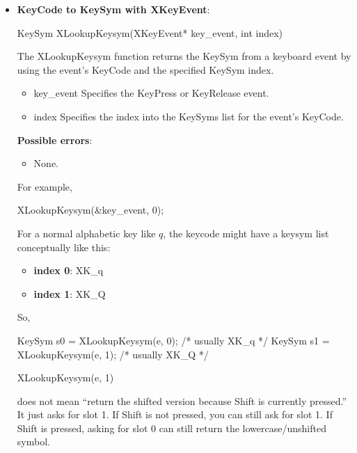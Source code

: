 \documentclass{report}
\begin{document}
\begin{itemize}
            \textbf{Possible errors}:
            \begin{itemize}
                \item None.
            \end{itemize}
        \item \textbf{KeyCode to KeySym with XKeyEvent}:
            \bigbreak \noindent 
            \begin{cppcode}
                KeySym XLookupKeysym(XKeyEvent* key_event, int index)
            \end{cppcode}
            \bigbreak \noindent
            The XLookupKeysym function returns the KeySym from a keyboard event by using the event's KeyCode and the specified KeySym index.
            \begin{itemize}
                \item key\_event Specifies the KeyPress or KeyRelease event.
                \item index Specifies the index into the KeySyms list for the event’s KeyCode.
            \end{itemize}
            \textbf{Possible errors}:
            \begin{itemize}
                \item None.
            \end{itemize}
            \bigbreak \noindent 
            For example,
            \bigbreak \noindent 
            \begin{cppcode}
                XLookupKeysym(&key_event, 0);
            \end{cppcode}
            \bigbreak \noindent 
            For a normal alphabetic key like $q$, the keycode might have a keysym list conceptually like this:
            \begin{itemize}
                \item \textbf{index 0}: XK\_q
                \item \textbf{index 1}: XK\_Q
            \end{itemize}
            So,
            \bigbreak \noindent 
            \begin{cppcode}
                KeySym s0 = XLookupKeysym(e, 0);  /* usually XK_q */
                KeySym s1 = XLookupKeysym(e, 1);  /* usually XK_Q */
            \end{cppcode}
            \bigbreak \noindent 
            \begin{cppcode}
            XLookupKeysym(e, 1)
            \end{cppcode}
            \bigbreak \noindent 
            does not mean “return the shifted version because Shift is currently pressed.” It just asks for slot 1. If Shift is not pressed, you can still ask for slot 1. If Shift is pressed, asking for slot 0 can still return the lowercase/unshifted symbol.

    \end{itemize}
\end{document}
